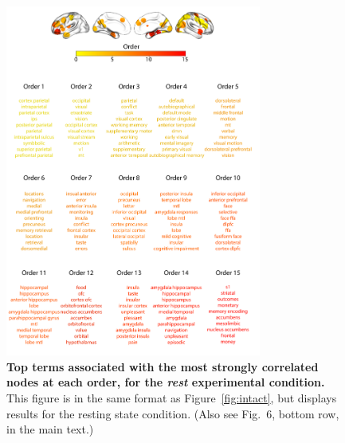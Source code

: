 \documentclass{article}
\newcommand{\neurosynth}{6}
\begin{document}
\begin{figure}[p!]
\centering
\includegraphics[width=0.75\textwidth]{figs/supp_15_rest}
\caption{\textbf{Top terms associated with the most strongly
      correlated nodes at each order, for the \textit{rest} experimental
    condition.}  This figure is in the same format as
  Figure~\ref{fig:intact}, but displays results for the
  resting state condition.  (Also see Fig.~\neurosynth,
bottom row, in the main text.)}
\label{fig:rest}
\end{figure}
\end{document}
